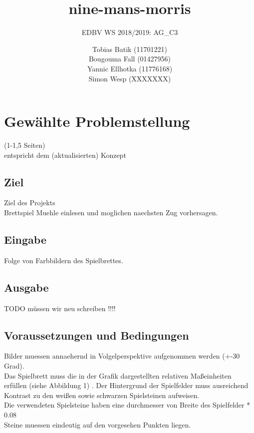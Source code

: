 \documentclass[paper=A4, deutsch]{scrartcl}
\begin{document}

\title{nine-mans-morris} %

\subtitle{EDBV WS 2018/2019: AG\_C3} %


\author{Tobias Batik (11701221)\\
Bougouma Fall (01427956)\\
Yannic Ellhotka (11776168)\\
Simon Wesp (XXXXXXX)
}




\maketitle


\section{Gewählte Problemstellung}
(1-1,5 Seiten)\\
entspricht dem (aktualisierten) Konzept
\subsection{Ziel}
Ziel des Projekts\\
Brettspiel Muehle einlesen und moglichen naechsten Zug vorhersagen.
\subsection{Eingabe}
Folge von Farbbildern des Spielbrettes. 

\subsection{Ausgabe}
TODO müssen wir neu schreiben !!!!
\subsection{Voraussetzungen und Bedingungen}
Bilder muessen annaehernd in Volgelperspektive aufgenommen werden (+-30 Grad). \\
Das Spielbrett muss die in der Grafik dargestellten relativen Maßeinheiten erfüllen (siehe Abbildung 1) . 
Der Hintergrund der Spielfelder muss ausreichend Kontrast zu den weißen sowie schwarzen Spielsteinen aufweisen. \\
Die verwendeten Spielsteine haben eine durchmesser von Breite des Spielfelder * 0.08\\
Steine muessen eindeutig auf den vorgesehen Punkten liegen.\\
\end{document}
